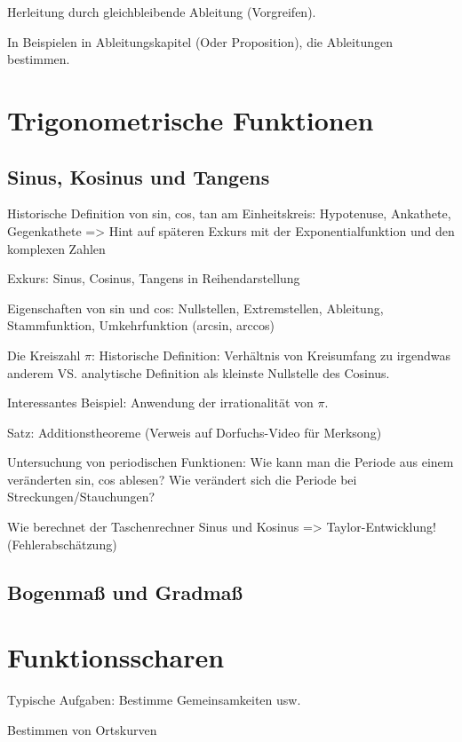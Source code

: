 Herleitung durch gleichbleibende Ableitung (Vorgreifen). 

In Beispielen in Ableitungskapitel (Oder Proposition), die Ableitungen bestimmen. 

\section{Trigonometrische Funktionen}

\subsection{Sinus, Kosinus und Tangens}
Historische Definition von sin, cos, tan am Einheitskreis: Hypotenuse, Ankathete, Gegenkathete => Hint auf späteren Exkurs mit der Exponentialfunktion und den komplexen Zahlen

\begin{definition}
    
\end{definition}

Exkurs: Sinus, Cosinus, Tangens in Reihendarstellung

\begin{definition}
    
\end{definition}

Eigenschaften von sin und cos: Nullstellen, Extremstellen, Ableitung, Stammfunktion, Umkehrfunktion (arcsin, arccos)

Die Kreiszahl \(\pi\): Historische Definition: Verhältnis von Kreisumfang zu irgendwas anderem VS. analytische Definition als kleinste Nullstelle des Cosinus. 

Interessantes Beispiel: Anwendung der irrationalität von \(\pi\). 

Satz: Additionstheoreme (Verweis auf Dorfuchs-Video für Merksong)
\begin{theorem}[Additionstheoreme]
    
\end{theorem}

\begin{corollary}[Doppelwinkelformeln]
    
\end{corollary}

Untersuchung von periodischen Funktionen: Wie kann man die Periode aus einem veränderten sin, cos ablesen? Wie verändert sich die Periode bei Streckungen/Stauchungen?

Wie berechnet der Taschenrechner Sinus und Kosinus => Taylor-Entwicklung! (Fehlerabschätzung)

\subsection{Bogenmaß und Gradmaß}


\section{Funktionsscharen}
Typische Aufgaben: Bestimme Gemeinsamkeiten usw. 

Bestimmen von Ortskurven